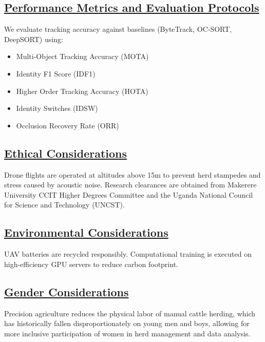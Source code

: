 \documentclass[12pt]{article}
\begin{document}
\subsection*{\underline{\textbf{Performance Metrics and Evaluation Protocols}}}
We evaluate tracking accuracy against baselines (ByteTrack, OC-SORT, DeepSORT) using:
\begin{itemize}
    \item Multi-Object Tracking Accuracy (MOTA)
    \item Identity F1 Score (IDF1)
    \item Higher Order Tracking Accuracy (HOTA)
    \item Identity Switches (IDSW)
    \item Occlusion Recovery Rate (ORR)
\end{itemize}

\subsection*{\underline{\textbf{Ethical Considerations}}}
Drone flights are operated at altitudes above 15m to prevent herd stampedes and stress caused by acoustic noise. Research clearances are obtained from Makerere University CCIT Higher Degrees Committee and the Uganda National Council for Science and Technology (UNCST).

\subsection*{\underline{\textbf{Environmental Considerations}}}
UAV batteries are recycled responsibly. Computational training is executed on high-efficiency GPU servers to reduce carbon footprint.

\subsection*{\underline{\textbf{Gender Considerations}}}
Precision agriculture reduces the physical labor of manual cattle herding, which has historically fallen disproportionately on young men and boys, allowing for more inclusive participation of women in herd management and data analysis.
\end{document}
